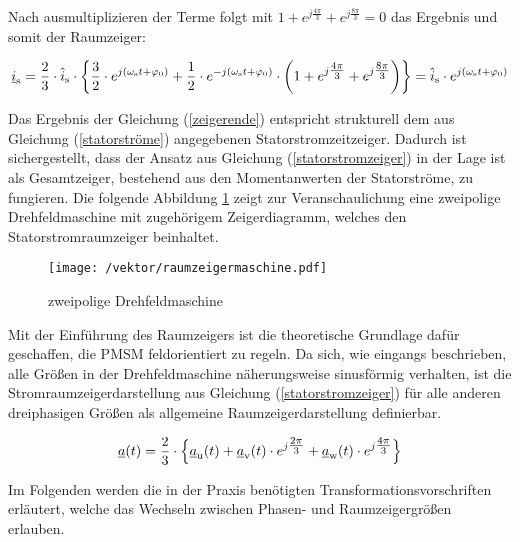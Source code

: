 Nach ausmultiplizieren der Terme folgt mit $1+e^{j\tfrac{4\pi}{3}}+e^{j\tfrac{8\pi}{3}}=0$ das Ergebnis und somit der Raumzeiger:

\begin{align}
\begin{split}
	\underline{i}_{\mathrm{s}} = \frac{2}{3} \cdot \hat{i}_{\mathrm{s}}\cdot\biggl\{ \frac{3}{2} \cdot  e^{j(\omega_{\mathrm{s}}t+\varphi_{\mathrm{0}})} + \frac{1}{2} \cdot e^{-j(\omega_{\mathrm{s}}t+\varphi_{\mathrm{0}})} \cdot \bigg( 1+e^{j\tfrac{4\pi}{3}}+e^{j\tfrac{8\pi}{3}} \bigg)  \biggr\} = \hat{i}_{\mathrm{s}} \cdot e^{j(\omega_{\mathrm{s}}t+\varphi_{\mathrm{0}})}
	\label{zeigerende}
\end{split}
\end{align}

\newpage

Das Ergebnis der Gleichung (\ref{zeigerende}) entspricht strukturell dem aus Gleichung (\ref{statorströme}) angegebenen Statorstromzeitzeiger. 
Dadurch ist sichergestellt, dass der Ansatz aus Gleichung (\ref{statorstromzeiger}) in der Lage ist als Gesamtzeiger, bestehend aus den Momentanwerten der Statorströme, zu fungieren. 
Die folgende Abbildung \ref{fig:raumzeigermaschine} zeigt zur Veranschaulichung eine zweipolige Drehfeldmaschine mit zugehörigem Zeigerdiagramm, welches den Statorstromraumzeiger beinhaltet. 

\begin{figure}[h]
	\centering
	\texttt{[image: /vektor/raumzeigermaschine.pdf]}
	\label{fig:raumzeigermaschine}
	\caption{zweipolige Drehfeldmaschine}
\end{figure}


Mit der Einführung des Raumzeigers ist die theoretische Grundlage dafür geschaffen, die PMSM feldorientiert zu regeln.
Da sich, wie eingangs beschrieben, alle Größen in der Drehfeldmaschine näherungsweise sinusförmig verhalten, ist die Stromraumzeigerdarstellung aus Gleichung (\ref{statorstromzeiger}) für alle anderen dreiphasigen Größen als allgemeine Raumzeigerdarstellung definierbar.

\begin{align}
	\underline{a}(t) = \frac{2}{3} \cdot \Bigl\{\underline{a}_{\mathrm{u}}(t) + \underline{a}_{\mathrm{v}}(t)\cdot e^{j\tfrac{2\pi}{3}} + \underline{a}_{\mathrm{w}}(t)\cdot e^{j\tfrac{4\pi}{3}} \Bigr\} \label{raumzeigerdefinition}
\end{align}

Im Folgenden werden die in der Praxis benötigten Transformationsvorschriften erläutert, welche das Wechseln zwischen Phasen- und Raumzeigergrößen erlauben.



